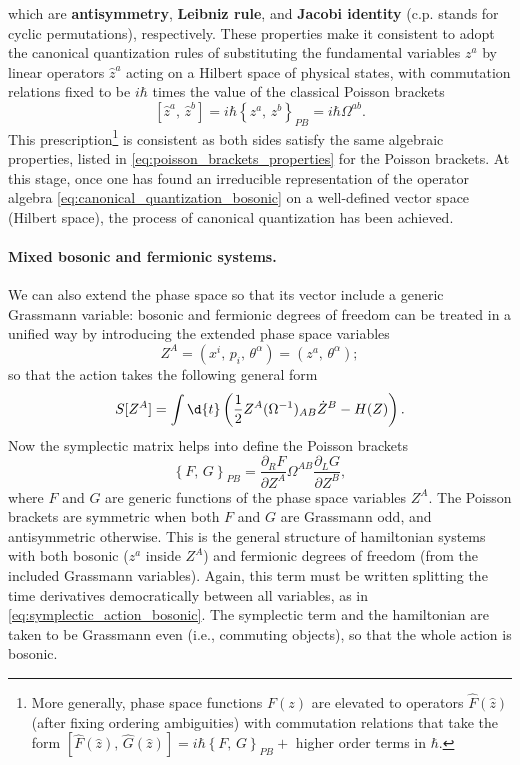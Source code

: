 which are \textbf{antisymmetry}, \textbf{Leibniz rule}, and \textbf{Jacobi identity} (c.p. stands for cyclic permutations), respectively. These properties make it consistent to adopt the canonical quantization rules of substituting the fundamental variables \(z^a\) by linear operators \(\hat{z}^a\) acting on a Hilbert space of physical states, with commutation relations fixed to be \(i\hbar\) times the value of the classical Poisson brackets
\begin{equation}
    \left[ \hat{z}^a,\,\hat{z}^b \right] = i \hbar \left\{ z^a,\,z^b \right\}_{PB} = i \hbar \Omega^{ab}.
    \label{eq:canonical_quantization_bosonic}
\end{equation}
This prescription\footnote{More generally, phase space functions \(F(z)\) are elevated to operators \(\hat{F}(\hat{z})\) (after fixing ordering ambiguities) with commutation relations that take the form \(\left[ \hat{F}(\hat{z}),\,\hat{G}(\hat{z}) \right] = i\hbar \left\{ F,\,G \right\}_{PB} +\) higher order terms in \(\hbar\).} is consistent as both sides satisfy the same algebraic properties, listed in \eqref{eq:poisson_brackets_properties} for the Poisson brackets. At this stage, once one has found an irreducible representation of the operator algebra \eqref{eq:canonical_quantization_bosonic} on a well-defined vector space (Hilbert space), the process of canonical quantization has been achieved.

\paragraph{Mixed bosonic and fermionic systems.} We can also extend the phase space so that its vector include a generic Grassmann variable: bosonic and fermionic degrees of freedom can be treated in a unified way by introducing the extended phase space variables
\[
    Z^A = \left(x^i,\,p_i,\,\theta^{\alpha}\right) = \left( z^a,\,\theta^{\alpha} \right);
\]
so that the action takes the following general form
\[
    S[Z^A] = \int \d{t} \left(\frac{1}{2}Z^A (\Omega^{-1})_{AB}\dot{Z}^B - H(Z)\right).
\]
Now the symplectic matrix helps into define the Poisson brackets
\begin{equation}
    \left\{F,\,G\right\}_{PB} = \frac{\partial_R F}{\partial Z^A} \Omega^{AB} \frac{\partial_L G}{\partial Z^B},
    \label{eq:poisson_brackets_mixed_space}
\end{equation}
where \(F\) and \(G\) are generic functions of the phase space variables \(Z^A\). The Poisson brackets are symmetric when both \(F\) and \(G\) are Grassmann odd, and antisymmetric otherwise. This is the general structure of hamiltonian systems with both bosonic (\(z^a\) inside \(Z^A\)) and fermionic degrees of freedom (from the included Grassmann variables). Again, this term must be written splitting the time derivatives democratically between all variables, as in \eqref{eq:symplectic_action_bosonic}. The symplectic term and the hamiltonian are taken to be Grassmann even (i.e., commuting objects), so that the whole action is bosonic.

